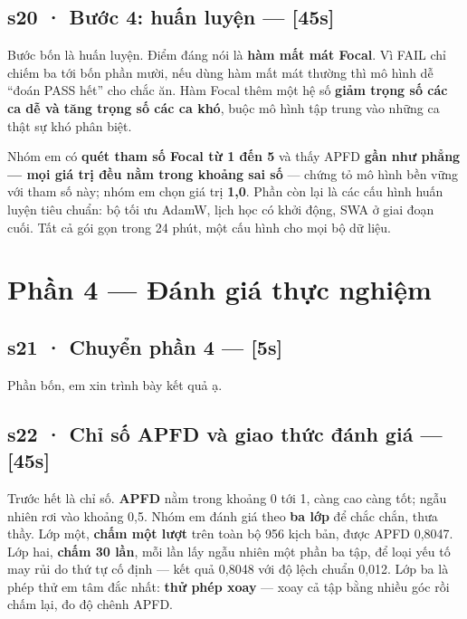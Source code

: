 \documentclass[
  11pt,
]{article}
\begin{document}
\subsection{s20 · Bước 4: huấn luyện ---
{[}45s{]}}\label{s20-bux1b0ux1edbc-4-huux1ea5n-luyux1ec7n-45s}

Bước bốn là huấn luyện. Điểm đáng nói là \textbf{hàm mất mát Focal}. Vì
FAIL chỉ chiếm ba tới bốn phần mười, nếu dùng hàm mất mát thường thì mô
hình dễ ``đoán PASS hết'' cho chắc ăn. Hàm Focal thêm một hệ số
\textbf{giảm trọng số các ca dễ và tăng trọng số các ca khó}, buộc mô
hình tập trung vào những ca thật sự khó phân biệt.

Nhóm em có \textbf{quét tham số Focal từ 1 đến 5} và thấy APFD
\textbf{gần như phẳng --- mọi giá trị đều nằm trong khoảng sai số} ---
chứng tỏ mô hình bền vững với tham số này; nhóm em chọn giá trị
\textbf{1,0}. Phần còn lại là các cấu hình huấn luyện tiêu chuẩn: bộ tối
ưu AdamW, lịch học có khởi động, SWA ở giai đoạn cuối. Tất cả gói gọn
trong 24 phút, một cấu hình cho mọi bộ dữ liệu.

\section{Phần 4 --- Đánh giá thực
nghiệm}\label{phux1ea7n-4-ux111uxe1nh-giuxe1-thux1ef1c-nghiux1ec7m}

\subsection{s21 · Chuyển phần 4 ---
{[}5s{]}}\label{s21-chuyux1ec3n-phux1ea7n-4-5s}

Phần bốn, em xin trình bày kết quả ạ.

\subsection{s22 · Chỉ số APFD và giao thức đánh giá ---
{[}45s{]}}\label{s22-chux1ec9-sux1ed1-apfd-vuxe0-giao-thux1ee9c-ux111uxe1nh-giuxe1-45s}

Trước hết là chỉ số. \textbf{APFD} nằm trong khoảng 0 tới 1, càng cao
càng tốt; ngẫu nhiên rơi vào khoảng 0,5. Nhóm em đánh giá theo
\textbf{ba lớp} để chắc chắn, thưa thầy. Lớp một, \textbf{chấm một lượt}
trên toàn bộ 956 kịch bản, được APFD 0,8047. Lớp hai, \textbf{chấm 30
lần}, mỗi lần lấy ngẫu nhiên một phần ba tập, để loại yếu tố may rủi do
thứ tự cố định --- kết quả 0,8048 với độ lệch chuẩn 0,012. Lớp ba là
phép thử em tâm đắc nhất: \textbf{thử phép xoay} --- xoay cả tập bằng
nhiều góc rồi chấm lại, đo độ chênh APFD.
\end{document}
